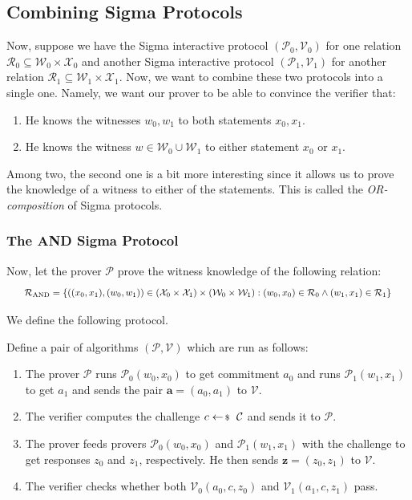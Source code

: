\documentclass[../lecture-notes-148x210.tex]{subfiles}
\begin{document}
\subsection{Combining Sigma Protocols}

Now, suppose we have the Sigma interactive protocol $(\mathcal{P}_0,\mathcal{V}_0)$ for one relation $\mathcal{R}_0 \subseteq \mathcal{W}_0 \times \mathcal{X}_0$ and another Sigma interactive protocol $(\mathcal{P}_1,\mathcal{V}_1)$ for another relation $\mathcal{R}_1 \subseteq \mathcal{W}_1 \times \mathcal{X}_1$. Now, we want to combine these two protocols into a single one. Namely, we want our prover to be able to convince the verifier that:
\begin{enumerate}
    \item He knows the witnesses $w_0,w_1$ to both statements $x_0,x_1$.
    \item He knows the witness $w \in \mathcal{W}_0 \cup \mathcal{W}_1$ to either statement $x_0$ or $x_1$.
\end{enumerate}

Among two, the second one is a bit more interesting since it allows us to prove the knowledge of a witness to either of the statements. This is called the \textit{OR-composition} of Sigma protocols.

\subsubsection{The AND Sigma Protocol}

Now, let the prover $\mathcal{P}$ prove the witness knowledge of the following relation:
\begin{equation*}
    \scalebox{0.85}{$
        \mathcal{R}_{\text{AND}} = \left\{ ((x_0,x_1), (w_0,w_1)) \in (\mathcal{X}_0 \times \mathcal{X}_1) \times (\mathcal{W}_0 \times \mathcal{W}_1): (w_0,x_0) \in \mathcal{R}_0 \wedge (w_1,x_1) \in \mathcal{R}_1 \right\}
    $}
\end{equation*}

We define the following protocol.

\begin{definition}
    Define a pair of algorithms $(\mathcal{P},\mathcal{V})$ which are run as follows:
    \begin{enumerate}
        \item The prover $\mathcal{P}$ runs $\mathcal{P}_0(w_0,x_0)$ to get commitment $a_0$ and runs $\mathcal{P}_1(w_1,x_1)$ to get $a_1$ and sends the pair $\mathbf{a} = (a_0,a_1)$ to $\mathcal{V}$.
        \item The verifier computes the challenge $c \leftarrowS \mathcal{C}$ and sends it to $\mathcal{P}$.
        \item The prover feeds provers $\mathcal{P}_0(w_0,x_0)$ and $\mathcal{P}_1(w_1,x_1)$ with the challenge to get responses $z_0$ and $z_1$, respectively. He then sends $\mathbf{z} = (z_0,z_1)$ to $\mathcal{V}$.
        \item The verifier checks whether both $\mathcal{V}_0(a_0,c,z_0)$ and $\mathcal{V}_1(a_1,c,z_1)$ pass.
    \end{enumerate}
\end{definition}
\end{document}
